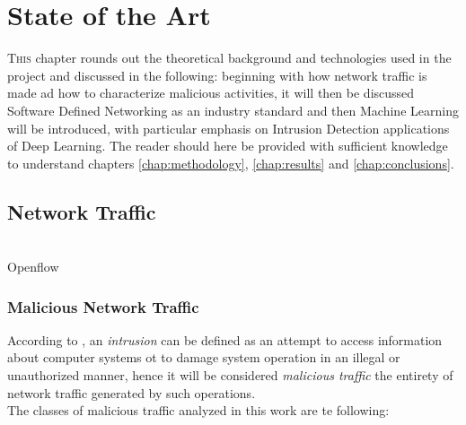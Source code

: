 \chapter{State of the Art}
\label{chap:state-of-the-art}

\lettrine[lines=3, findent=3pt, nindent=0pt]{T}{his} chapter rounds out the theoretical background and technologies used in the project and discussed in the following: beginning with how network traffic is made ad how to characterize malicious activities, it will then be discussed Software Defined Networking as an industry standard and then Machine Learning will be introduced, with particular emphasis on Intrusion Detection applications of Deep Learning. The reader should here be provided with sufficient knowledge to understand chapters \ref{chap:methodology}, \ref{chap:results} and \ref{chap:conclusions}.


\section{Network Traffic}
\label{sec:network-traffic}

\lipsum \\
Openflow


\subsection{Malicious Network Traffic}
\label{subsec:malicious-traffic}

According to \cite{Liu2019}, an \textit{intrusion} can be defined as an attempt to access information about computer systems ot to damage system operation in an illegal or unauthorized manner, hence it will be considered \textit{malicious traffic} the entirety of network traffic generated by such operations. \\
The classes of malicious traffic analyzed in this work are te following:

